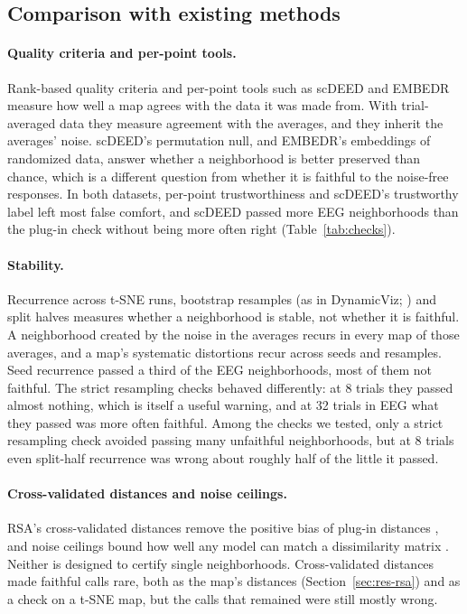 \subsection{Comparison with existing methods}

\paragraph{Quality criteria and per-point tools.} Rank-based quality criteria
\citep{venna2001,kaski2003,chen2009,lee2009,venna2010} and per-point tools such as scDEED
\citep{xia2024} and EMBEDR \citep{johnson2022} measure how well a map agrees with the data it was
made from. With trial-averaged data they measure agreement with the averages, and they inherit the
averages' noise. scDEED's permutation null, and EMBEDR's embeddings of randomized data, answer
whether a neighborhood is better preserved than chance, which is a different question from
whether it is faithful to the noise-free responses. In both datasets, per-point trustworthiness and
scDEED's trustworthy label left most false comfort, and scDEED passed more EEG neighborhoods than
the plug-in check without being more often right (Table~\ref{tab:checks}).

\paragraph{Stability.} Recurrence across t-SNE runs, bootstrap resamples (as in DynamicViz;
\citealp{sun2023}) and split halves measures whether a neighborhood is stable, not whether it is
faithful. A neighborhood created by the noise in the averages recurs in every map of those
averages, and a map's systematic distortions recur across seeds and resamples. Seed recurrence
passed a third of the EEG neighborhoods, most of them not faithful. The strict resampling checks
behaved differently: at 8 trials they passed almost nothing, which is itself a useful warning, and
at 32 trials in EEG what they passed was more often faithful. Among the checks we tested, only a
strict resampling check avoided passing many unfaithful neighborhoods, but at 8 trials even
split-half recurrence was wrong about roughly half of the little it passed.

\paragraph{Cross-validated distances and noise ceilings.} RSA's cross-validated distances remove
the positive bias of plug-in distances \citep{walther2016,guggenmos2018}, and noise ceilings bound
how well any model can match a dissimilarity matrix \citep{nili2014,schutt2023}. Neither is
designed to certify single neighborhoods. Cross-validated distances made faithful calls rare, both
as the map's distances (Section~\ref{sec:res-rsa}) and as a check on a t-SNE map, but the calls that
remained were still mostly wrong.

